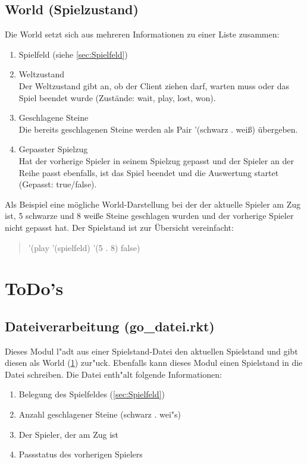 \documentclass[a4paper]{scrreprt}
\begin{document}
\section{World (Spielzustand)}
\label{sec:World}
Die World setzt sich aus mehreren Informationen zu einer Liste zusammen:

\begin{enumerate}
\item Spielfeld (siehe \ref{sec:Spielfeld})
\item Weltzustand\\
Der Weltzustand gibt an, ob der Client ziehen darf, warten muss oder das Spiel beendet wurde (Zustände: wait, play, lost, won).
\item Geschlagene Steine\\
Die bereits geschlagenen Steine werden als Pair '(schwarz . weiß) übergeben.
\item Gepasster Spielzug\\
Hat der vorherige Spieler in seinem Spielzug gepasst und der Spieler an der Reihe passt ebenfalls, ist das Spiel beendet und die Auswertung startet (Gepasst: true/false). 
\end{enumerate}
Als Beispiel eine mögliche World-Darstellung bei der der aktuelle Spieler am Zug ist, 5 schwarze und 8 weiße Steine geschlagen wurden und der vorherige Spieler nicht gepasst hat. Der Spielstand ist zur Übersicht vereinfacht:
\begin{quotation}
 '(play '(spielfeld) '(5 . 8) false)
\end{quotation}

\chapter{ToDo's}

\section{Dateiverarbeitung (go\_datei.rkt)}
Dieses Modul l"adt aus einer Spielstand-Datei den aktuellen Spielstand und gibt diesen als World (\ref{sec:World}) zur"uck. Ebenfalls kann dieses Modul einen Spielstand in die Datei schreiben. Die Datei enth"alt folgende Informationen:

\begin{enumerate}
\item Belegung des Spielfeldes (\ref{sec:Spielfeld})
\item Anzahl geschlagener Steine (schwarz . wei"s)
\item Der Spieler, der am Zug ist
\item Passstatus des vorherigen Spielers
\end{enumerate}
\end{document}

